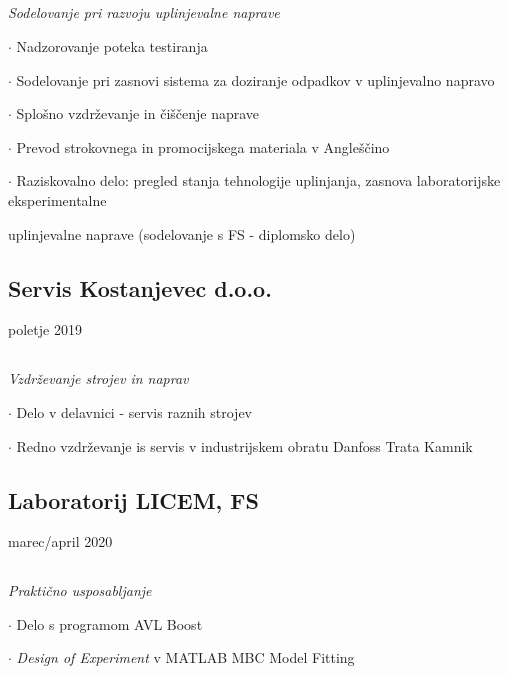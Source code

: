 \documentclass{article}
\begin{document}
\subsection{}
{\em Sodelovanje pri razvoju uplinjevalne naprave}
\smallskip
\begin{compactitem}
\setlength{\itemindent}{-8.5mm}
\setlength{\listparindent}{-2cm}
	\item[$ \cdot  $] Nadzorovanje poteka testiranja
	\item[$ \cdot  $] Sodelovanje pri zasnovi sistema za doziranje odpadkov v uplinjevalno napravo 
	\item[$ \cdot  $] Splošno vzdrževanje in čiščenje naprave
	\item[$ \cdot  $] Prevod strokovnega in promocijskega materiala v Angleščino
	\item[$ \cdot  $] Raziskovalno delo: pregled stanja tehnologije uplinjanja, zasnova laboratorijske eksperimentalne 
	\item[]uplinjevalne naprave (sodelovanje s FS - diplomsko delo)
\end{compactitem}

\pagebreak

\subsection{Servis Kostanjevec d.o.o.} {\scriptsize \hfill poletje 2019}
\subsection{}
{\em Vzdrževanje strojev in naprav}
\smallskip
\begin{compactitem}
\setlength{\itemindent}{-8.5mm}
	\item[$ \cdot  $]Delo v delavnici - servis raznih strojev
	\item[$ \cdot  $]Redno vzdrževanje is servis v industrijskem obratu Danfoss Trata Kamnik
\end{compactitem}

\bigskip

\subsection{Laboratorij LICEM, FS} {\scriptsize \hfill marec/april 2020}
\subsection{}
{\em Praktično usposabljanje}
\smallskip
\begin{compactitem}
\setlength{\itemindent}{-8.5mm}
	\item[$ \cdot  $]Delo s programom AVL Boost
	\item[$ \cdot  $]{\em Design of Experiment} v MATLAB MBC Model Fitting 
\end{compactitem}
\end{document}
